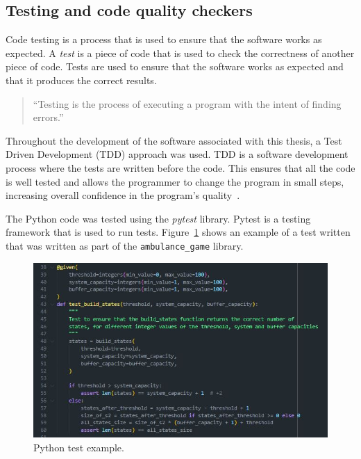 \subsection{Testing and code quality checkers}\label{sec:intro_test_code}

Code testing is a process that is used to ensure that the software works as
expected.
A \textit{test} is a piece of code that is used to check the correctness of
another piece of code.
Tests are used to ensure that the software works as expected and that it
produces the correct results.

\begin{quotation}
    ``Testing is the process of executing a program with the intent of finding
    errors.''~\cite{myers2011art}
\end{quotation}


Throughout the development of the software associated with this thesis, a
Test Driven Development (TDD) approach was used.
TDD is a software development process where the tests are written before the
code.
This ensures that all the code is well tested and allows the programmer to
change the program in small steps, increasing overall confidence in the
program's quality~\cite{astels2003test}.

The Python code was tested using the \textit{pytest} library.
Pytest is a testing framework that is used to run tests.
Figure~\ref{fig:test_example} shows an example of a test written that was
written as part of the \texttt{ambulance\_game} library.

\begin{figure}[H]
    \includegraphics[width=\linewidth]{chapters/01_introduction/Bin/test_example.JPG}
    \caption{Python test example.}
    \label{fig:test_example}
\end{figure}

